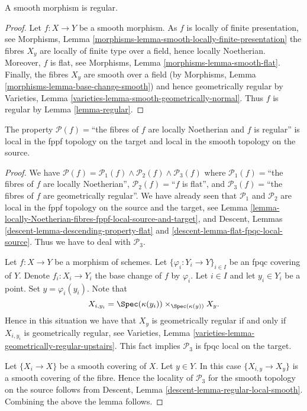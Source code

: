 \begin{lemma}
\label{lemma-smooth-regular}
A smooth morphism is regular.
\end{lemma}

\begin{proof}
Let $f : X \to Y$ be a smooth morphism.
As $f$ is locally of finite presentation, see
Morphisms, Lemma \ref{morphisms-lemma-smooth-locally-finite-presentation}
the fibres $X_y$ are locally of finite type over a field, hence
locally Noetherian. Moreover, $f$ is flat, see
Morphisms, Lemma \ref{morphisms-lemma-smooth-flat}.
Finally, the fibres $X_y$ are smooth over a field (by
Morphisms, Lemma \ref{morphisms-lemma-base-change-smooth})
and hence geometrically regular by
Varieties, Lemma \ref{varieties-lemma-smooth-geometrically-normal}.
Thus $f$ is regular by
Lemma \ref{lemma-regular}.
\end{proof}

\begin{lemma}
\label{lemma-regular-fppf-local-source-and-target}
The property $\mathcal{P}(f)=$``the fibres of $f$ are
locally Noetherian and $f$ is regular''
is local in the fppf topology on the target and
local in the smooth topology on the source.
\end{lemma}

\begin{proof}
We have
$\mathcal{P}(f) =
\mathcal{P}_1(f) \wedge \mathcal{P}_2(f) \wedge \mathcal{P}_3(f)$
where
$\mathcal{P}_1(f)=$``the fibres of $f$ are locally Noetherian'',
$\mathcal{P}_2(f)=$``$f$ is flat'', and
$\mathcal{P}_3(f)=$``the fibres of $f$ are geometrically regular''.
We have already seen that $\mathcal{P}_1$ and $\mathcal{P}_2$
are local in the fppf topology on the source and the target, see
Lemma \ref{lemma-locally-Noetherian-fibres-fppf-local-source-and-target},
and Descent, Lemmas \ref{descent-lemma-descending-property-flat} and
\ref{descent-lemma-flat-fpqc-local-source}. Thus we have to deal
with $\mathcal{P}_3$.

\medskip\noindent
Let $f : X \to Y$ be a morphism of schemes.
Let $\{\varphi_i : Y_i \to Y\}_{i \in I}$ be an fpqc covering of $Y$.
Denote $f_i : X_i \to Y_i$ the base change of $f$ by $\varphi_i$.
Let $i \in I$ and let $y_i \in Y_i$ be a point.
Set $y = \varphi_i(y_i)$. Note that
$$
X_{i, y_i} = \Spec(\kappa(y_i)) \times_{\Spec(\kappa(y))} X_y.
$$
Hence in this situation we have that $X_y$ is geometrically regular if and
only if $X_{i, y_i}$ is geometrically regular, see
Varieties, Lemma \ref{varieties-lemma-geometrically-regular-upstairs}.
This fact implies $\mathcal{P}_3$ is fpqc local on the target.

\medskip\noindent
Let $\{X_i \to X\}$ be a smooth covering of $X$.
Let $y \in Y$. In this case $\{X_{i, y} \to X_y\}$ is a
smooth covering of the fibre. Hence the locality of $\mathcal{P}_3$
for the smooth topology on the source follows from
Descent, Lemma \ref{descent-lemma-regular-local-smooth}.
Combining the above the lemma follows.
\end{proof}




